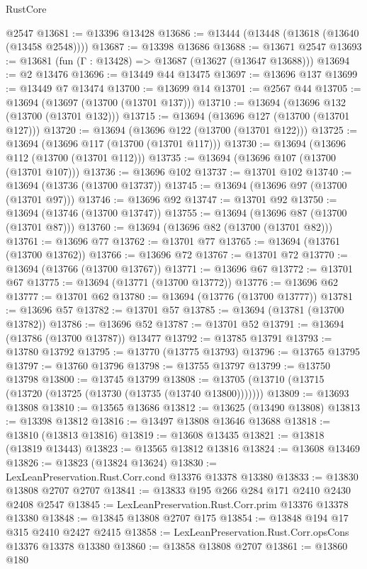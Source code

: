 \begin{lexlean}{RustCore}
\begin{coremodule}
    @2547
@13681 := @13396 @13428
@13686 := @13444 (@13448 (@13618 (@13640 (@13458 @2548))))
@13687 := @13398 @13686
@13688 := @13671 @2547
@13693 := @13681 (fun (Γ : @13428) => @13687 (@13627 (@13647 @13688)))
@13694 := @2 @13476
@13696 := @13449 @44 @13475
@13697 := @13696 @137
@13699 := @13449 @7 @13474
@13700 := @13699 @14
@13701 := @2567 @44
@13705 := @13694 (@13697 (@13700 (@13701 @137)))
@13710 := @13694 (@13696 @132 (@13700 (@13701 @132)))
@13715 := @13694 (@13696 @127 (@13700 (@13701 @127)))
@13720 := @13694 (@13696 @122 (@13700 (@13701 @122)))
@13725 := @13694 (@13696 @117 (@13700 (@13701 @117)))
@13730 := @13694 (@13696 @112 (@13700 (@13701 @112)))
@13735 := @13694 (@13696 @107 (@13700 (@13701 @107)))
@13736 := @13696 @102
@13737 := @13701 @102
@13740 := @13694 (@13736 (@13700 @13737))
@13745 := @13694 (@13696 @97 (@13700 (@13701 @97)))
@13746 := @13696 @92
@13747 := @13701 @92
@13750 := @13694 (@13746 (@13700 @13747))
@13755 := @13694 (@13696 @87 (@13700 (@13701 @87)))
@13760 := @13694 (@13696 @82 (@13700 (@13701 @82)))
@13761 := @13696 @77
@13762 := @13701 @77
@13765 := @13694 (@13761 (@13700 @13762))
@13766 := @13696 @72
@13767 := @13701 @72
@13770 := @13694 (@13766 (@13700 @13767))
@13771 := @13696 @67
@13772 := @13701 @67
@13775 := @13694 (@13771 (@13700 @13772))
@13776 := @13696 @62
@13777 := @13701 @62
@13780 := @13694 (@13776 (@13700 @13777))
@13781 := @13696 @57
@13782 := @13701 @57
@13785 := @13694 (@13781 (@13700 @13782))
@13786 := @13696 @52
@13787 := @13701 @52
@13791 := @13694 (@13786 (@13700 @13787)) @13477
@13792 := @13785 @13791
@13793 := @13780 @13792
@13795 := @13770 (@13775 @13793)
@13796 := @13765 @13795
@13797 := @13760 @13796
@13798 := @13755 @13797
@13799 := @13750 @13798
@13800 := @13745 @13799
@13808 := @13705 (@13710 (@13715 (@13720 (@13725 (@13730 (@13735 (@13740 @13800)))))))
@13809 := @13693 @13808
@13810 := @13565 @13686
@13812 := @13625 (@13490 @13808)
@13813 := @13398 @13812
@13816 := @13497 @13808 @13646 @13688
@13818 := @13810 (@13813 @13816)
@13819 := @13608 @13435
@13821 := @13818 (@13819 @13443)
@13823 := @13565 @13812 @13816
@13824 := @13608 @13469
@13826 := @13823 (@13824 @13624)
@13830 := LexLeanPreservation.Rust.Corr.cond @13376 @13378 @13380
@13833 := @13830 @13808 @2707 @2707
@13841 := @13833 @195 @266 @284 @171 @2410 @2430 @2408 @2547
@13845 := LexLeanPreservation.Rust.Corr.prim @13376 @13378 @13380
@13848 := @13845 @13808 @2707 @175
@13854 := @13848 @194 @17 @315 @2410 @2427 @2415
@13858 := LexLeanPreservation.Rust.Corr.opsCons @13376 @13378 @13380
@13860 := @13858 @13808 @2707
@13861 := @13860 @180

\end{coremodule}
\end{lexlean}
